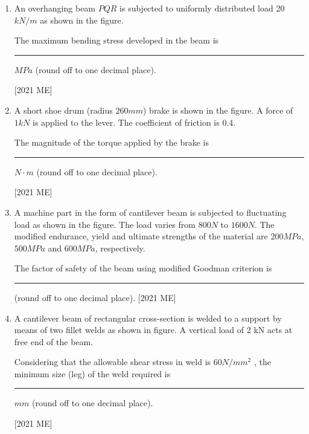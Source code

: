 \documentclass[journal]{IEEEtran}
\begin{document}
\begin{enumerate}
\hfill [2021 ME]
\item An overhanging beam $PQR$ is subjected to uniformly distributed load 20
$kN/m$ as shown in the figure. 

The maximum bending stress developed in the beam is \rule{2cm}{0.4pt} $MPa$ (round off to one decimal place).

\hfill [2021 ME]

\item A short shoe drum (radius $260 mm$) brake is shown in the figure. A force of
$1 kN$ is applied to the lever. The coefficient of friction is 0.4. 
 
The magnitude of the torque applied by the brake is \rule{2cm}{0.4pt}$N \cdot m$ (round off to one decimal place). 

\hfill [2021 ME]
\item A machine part in the form of cantilever beam is subjected to fluctuating
load as shown in the figure. The load varies from $800 N$ to $1600 N$. The
modified endurance, yield and ultimate strengths of the material are $200
MPa$, $500 MPa$ and $600 MPa$, respectively. 

The factor of safety of the beam using modified Goodman criterion is \rule{2cm}{0.4pt} (round off to one decimal place).
\hfill [2021 ME]
\item A cantilever beam of rectangular cross-section is welded to a support by
means of two fillet welds as shown in figure. A vertical load of 2 kN acts at
free end of the beam. 

Considering that the allowable shear stress in weld is $60 N/mm^2$
, the
minimum size (leg) of the weld required is \rule{2cm}{0.4pt} $mm$ (round off to one
decimal place).

\hfill [2021 ME]
\end{enumerate}
\end{document}
